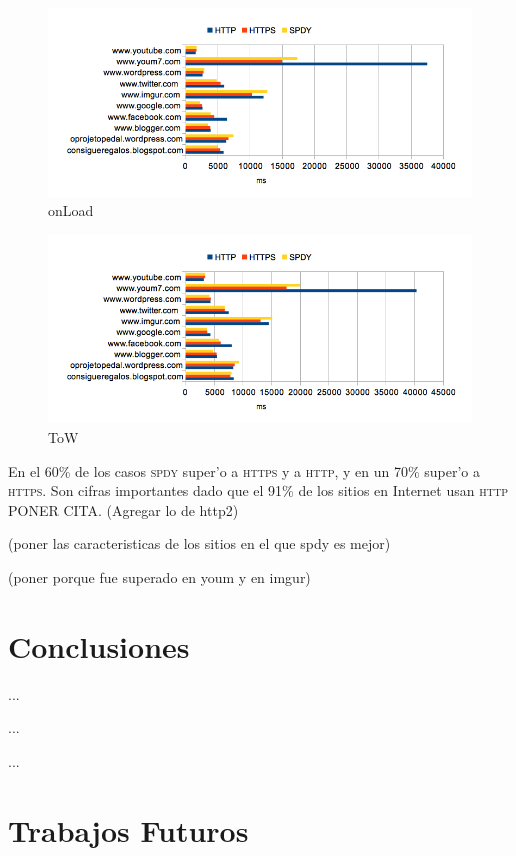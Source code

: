 \documentclass[a4paper,11pt,twocolumn]{article}
\begin{document}
\begin{figure}[ht]
  	\centering
	\includegraphics[scale=0.93]{exp2_2}
	\caption{\small onLoad}
	\label{graf8}
\end{figure}

\begin{figure}[ht]
  	\centering
	\includegraphics[scale=0.93]{exp2_3}
	\caption{\small ToW}
	\label{graf9}
\end{figure}

\vspace*{2\baselineskip}
En el 60\% de los casos \textsc{spdy} super'o a \textsc{https} y a \textsc{http}, y en un 70\% super'o a \textsc{https}. Son cifras importantes dado que el 91\% de los sitios en Internet usan \textsc{http} PONER CITA.
(Agregar lo de http2)

(poner las caracteristicas de los sitios en el que spdy es mejor)

(poner porque  fue superado en youm y en imgur)

\section{Conclusiones}

...

...

...

\section{Trabajos Futuros}
\end{document}
